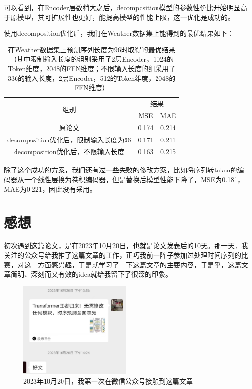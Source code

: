 \documentclass[twoside,12pt]{article}
\begin{document}
可以看到，在Encoder层数稍大之后，decomposition模型的参数性价比开始明显高于原模型，其可扩展性也更好，能提高模型的性能上限，这一优化是成功的。

使用decomposition优化后，我们在Weather数据集上能得到的最优结果如下：

\begin{table}[htbp]
  \caption{在Weather数据集上预测序列长度为96时取得的最优结果（其中限制输入长度的组别采用了2层Encoder，1024的Token维度，2048的FFN维度；不限输入长度的组采用了336的输入长度，2层Encoder，512的Token维度，2048的FFN维度）}
  \label{tab:result_best}
  \vspace{5pt}
  \centering
  \begin{tabular}{c|cc}
    \toprule
    \multirow{2}{*}{组别}                 & \multicolumn{2}{c}{结果}         \\
    \cmidrule(lr){2-3}
                                          & MSE                      & MAE   \\
    \midrule
    原论文                                & 0.174                    & 0.214 \\
    decomposition优化后，限制输入长度为96 & 0.171                    & 0.211 \\
    decomposition优化后，不限输入长度     & 0.163                    & 0.215 \\
    \bottomrule
  \end{tabular}
\end{table}

除了这个成功的方案，我们还有过一些失败的修改方案，比如将序列转token的编码器从一个线性层换为卷积编码器，但是替换后模型性能下降了，MSE为0.181，MAE为0.221，因此没有采用。

\section{感想}

初次遇到这篇论文，是在2023年10月20日，也就是论文发表后的10天。那一天，我关注的公众号给我推了这篇文章的工作，正巧我前一阵子参加过处理时间序列的比赛，对这一方面感兴趣，于是就学习了一下这篇文章的主要内容，于是乎，这篇文章简明、深刻而又有效的idea就给我留下了很深的印象。

\begin{figure}[htbp]
  \centering
  \includegraphics[width=0.5\textwidth]{./pic/itransformer_公众号.jpg}
  \caption{2023年10月20日，我第一次在微信公众号接触到这篇文章}
  \label{fig:wechat}
\end{figure}
\end{document}
